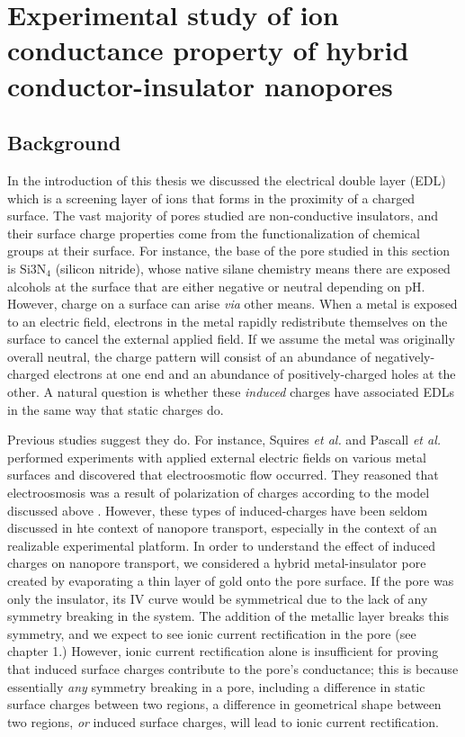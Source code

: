 \graphicspath{{../images/ch3/}}	%


\chapter{Experimental study of ion conductance property of hybrid conductor-insulator nanopores}
\label{chap:sin}
	

	\section{Background}
	
		In the introduction of this thesis we discussed the electrical double layer (EDL) which is a screening layer of ions that forms in the proximity of a charged surface. The vast majority of pores studied are non-conductive insulators, and their surface charge properties come from the functionalization of chemical groups at their surface. For instance, the base of the pore studied in this section is $\mathrm{Si{3}N_{4}}$ (silicon nitride), whose native silane chemistry means there are exposed alcohols at the surface that are either negative or neutral depending on pH. However, charge on a surface can arise \textit{via} other means. When a metal is exposed to an electric field, electrons in the metal rapidly redistribute themselves on the surface to cancel the external applied field. If we assume the metal was originally overall neutral, the charge pattern will consist of an abundance of negatively-charged electrons at one end and an abundance of positively-charged holes at the other. A natural question is whether these \textit{induced} charges have associated EDLs in the same way that static charges do.
		
		Previous studies suggest they do. For instance, Squires \textit{et al.} and Pascall \textit{et al.} performed experiments with applied external electric fields on various metal surfaces and discovered that electroosmotic flow occurred. They reasoned that electroosmosis was a result of polarization of charges according to the model discussed above \cite{Squires2004, Pascall2010}. However, these types of induced-charges have been seldom discussed in hte context of nanopore transport, especially in the context of an realizable experimental platform. In order to understand the effect of induced charges on nanopore transport, we considered a hybrid metal-insulator pore created by evaporating a thin layer of gold onto the pore surface. If the pore was only the insulator, its IV curve would be symmetrical due to the lack of any symmetry breaking in the system. The addition of the metallic layer breaks this symmetry, and we expect to see ionic current rectification in the pore (see chapter 1.) However, ionic current rectification alone is insufficient for proving that induced surface charges contribute to the pore's conductance; this is because essentially \textit{any} symmetry breaking in a pore, including a difference in static surface charges between two regions, a difference in geometrical shape between two regions, \textit{or} induced surface charges, will lead to ionic current rectification.
		

